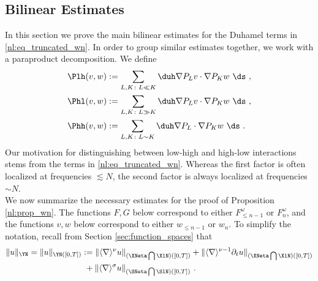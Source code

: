 \documentclass[11pt]{article}
\begin{document}
\subsection{Bilinear Estimates}
In this section we prove the main bilinear estimates for the Duhamel terms in \eqref{nl:eq_truncated_wn}. In order to group similar estimates together, we work with a paraproduct decomposition. We define
\begin{align*}
\Plh(v,w) &:= \sum_{L,K\colon L \ll K} \duh \nabla P_L v \cdot \nabla P_K w ~\ds ~,\\
\Phl(v,w) &:=\sum_{L,K\colon L \gg K } \duh \nabla P_L v \cdot \nabla P_K w ~\ds ~, \\
\Phh(v,w) &:= \sum_{L, K \colon L \sim K} \duh \nabla P_L \cdot \nabla P_K w ~\ds ~.  
\end{align*}
Our motivation for distinguishing between low-high and high-low interactions stems from the terms in \eqref{nl:eq_truncated_wn}. Whereas the first factor is often localized at frequencies \( \lesssim N\), the second factor is always localized at frequencies \( \sim N \).\\
We now summarize the necessary estimates for the proof of Proposition \ref{nl:prop_wn}. The functions \( F,G \) below correspond to either \( F_{\leq n-1}^\omega \) or \( F_n^\omega\), and the functions \( v,w \) below correspond to either \( w_{\leq n-1} \) or \( w_n \). To simplify the notation, recall from Section \ref{sec:function_spaces} that
\begin{equation*}
\begin{aligned}
\| u \|_{\YN} = \| u \|_{\YN([0,T])}&:= \| \langle \nabla \rangle^\nu u \|_{(\XNeta \bigcap \XlN)([0,T])} + \| \langle \nabla \rangle^{\nu-1} \partial_t u \|_{(\XNeta \bigcap \XlN)([0,T])} \\
							 &~+\| \langle \nabla \rangle^{\sigma} u \|_{(\SNeta \bigcap \SlN)([0,T])}~. 
\end{aligned}
\end{equation*}
\end{document}
